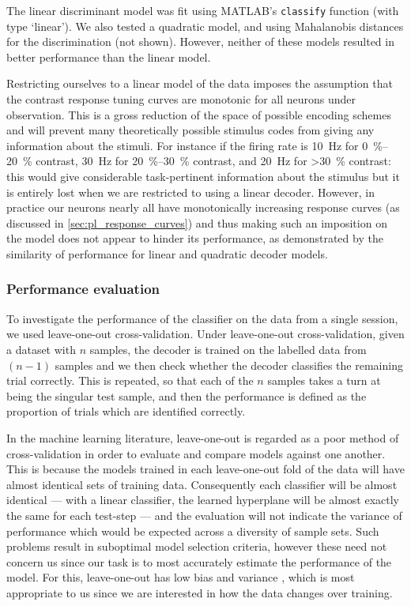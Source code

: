 The linear discriminant model was fit using MATLAB's \texttt{classify} function (with type `linear').
We also tested a quadratic model, and using Mahalanobis distances for the discrimination (not shown).
However, neither of these models resulted in better performance than the linear model.

Restricting ourselves to a linear model of the data imposes the assumption that the contrast response tuning curves are monotonic for all neurons under observation.
This is a gross reduction of the space of possible encoding schemes and will prevent many theoretically possible stimulus codes from giving any information about the stimuli.
For instance if the firing rate is \SI{10}{Hz} for \SIrange{0}{20}{\percent} contrast, \SI{30}{Hz} for \SIrange{20}{30}{\percent} contrast, and \SI{20}{Hz} for \SI{>30}{\percent} contrast: this would give considerable task-pertinent information about the stimulus but it is entirely lost when we are restricted to using a linear decoder.
However, in practice our neurons nearly all have monotonically increasing response curves (as discussed in \autoref{sec:pl_response_curves}) and thus making such an imposition on the model does not appear to hinder its performance, as demonstrated by the similarity of performance for linear and quadratic decoder models.


\subsubsection{Performance evaluation}
\label{sec:pl_decoder_evaluation}

To investigate the performance of the classifier on the data from a single session, we used leave-one-out cross-validation.
Under leave-one-out cross-validation, given a dataset with $n$ samples, the decoder is trained on the labelled data from $(n-1)$ samples and we then check whether the decoder classifies the remaining trial correctly.
This is repeated, so that each of the $n$ samples takes a turn at being the singular test sample, and then the performance is defined as the proportion of trials which are identified correctly.

In the machine learning literature, leave-one-out is regarded as a poor method of cross-validation in order to evaluate and compare models against one another.
This is because the models trained in each leave-one-out fold of the data will have almost identical sets of training data.
Consequently each classifier will be almost identical --- with a linear classifier, the learned hyperplane will be almost exactly the same for each test-step --- and the evaluation will not indicate the variance of performance which would be expected across a diversity of sample sets.
Such problems result in suboptimal model selection criteria, however these need not concern us since our task is to most accurately estimate the performance of the model.
For this, leave-one-out has low bias and variance \citep{Zhang2015}, which is most appropriate to us since we are interested in how the data changes over training.


